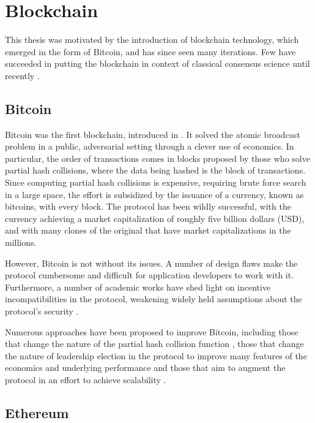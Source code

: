 \section{Blockchain}

This thesis was motivated by the introduction of blockchain technology, which emerged in the form of Bitcoin,
and has since seen many iterations.
Few have succeeded in putting the blockchain in context of classical consensus science until recently \cite{vukolic11quest,cachin2016non,honeybadger}.

\subsection{Bitcoin} 

Bitcoin was the first blockchain, introduced in \cite{bitcoin}.
It solved the atomic broadcast problem in a public, adversarial setting through a clever use of economics.
In particular, the order of transactions comes in blocks proposed by those who solve partial hash collisions,
where the data being hashed is the block of transactions.
Since computing partial hash collisions is expensive, requiring brute force search in a large space,
the effort is subsidized by the issuance of a currency, known as bitcoins, with every block.
The protocol has been wildly successful, with the currency achieving a market capitalization
of roughly five billion dollars (USD), and with many clones of the original that have market capitalizations in the millions.

However, Bitcoin is not without its issues. A number of design flaws make the protocol cumbersome and difficult 
for application developers to work with it.
Furthermore, a number of academic works have shed light on incentive incompatibilities in the protocol,
weakening widely held assumptions about the protocol's security \cite{eyal2014majority,courtois2014subversive}.

Numerous approaches have been proposed to improve Bitcoin,
including those that change the nature of the partial hash collision function \cite{miller2015nonoutsourceable},
those that change the nature of leadership election in the protocol to improve many features of the economics and underlying performance \cite{eyal2015bitcoin}
and those that aim to augment the protocol in an effort to achieve scalability \cite{sidechains,poon2015bitcoin}.

\subsection{Ethereum}

